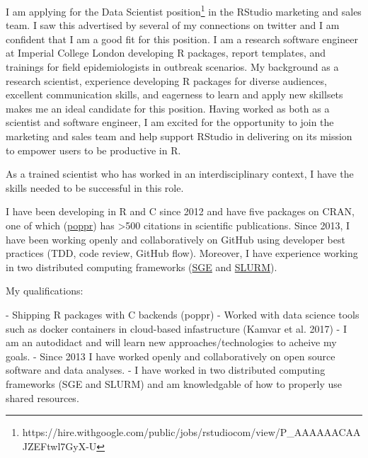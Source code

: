I am applying for the Data Scientist
position\footnote{https://hire.withgoogle.com/public/jobs/rstudiocom/view/P_AAAAAACAAJZEFtwl7GyX-U}
in the RStudio marketing and sales team. I saw this advertised by several of my
connections on twitter and I am confident that I am a good fit for this position. I am a research software engineer at Imperial College London developing R
packages, report templates, and trainings for field epidemiologists in outbreak
scenarios. My background as a research scientist, experience developing R
packages for diverse audiences, excellent communication skills, and eagerness
to learn and apply new skillsets makes me an ideal candidate for this position.
Having worked as both as a scientist and software engineer, I am excited for
the opportunity to join the marketing and sales team and help support RStudio in delivering on its mission to empower users to be productive in R. 


\vspace{1ex}

As a trained scientist who has worked in an interdisciplinary context, I have the skills needed to be successful in this role. 

I have been 
developing in R and C since 2012 and have five packages on CRAN, one of which
(\href{https://grunwaldlab.github.io/poppr}{poppr}) has \textgreater500
citations in scientific publications. Since 2013, I have been working openly and
collaboratively on GitHub using developer best practices (TDD, code review, 
GitHub flow). Moreover, I have experience working in two distributed computing
frameworks (\href{https://github.com/zkamvar/clonal-inference-simulations}{SGE}
and \href{https://github.com/zkamvar/read-processing}{SLURM}).



\vspace{1ex}


My qualifications: 

 - Shipping R packages with C backends (poppr)
 - Worked with data science tools such as docker containers in cloud-based infastructure (Kamvar et al. 2017)
 - I am an autodidact and will learn new approaches/technologies to acheive my goals.
 - Since 2013 I have worked openly and collaboratively on open source software and data analyses. 
 - I have worked in two distributed computing frameworks (SGE and SLURM) and am knowledgable of how to properly use shared resources.

